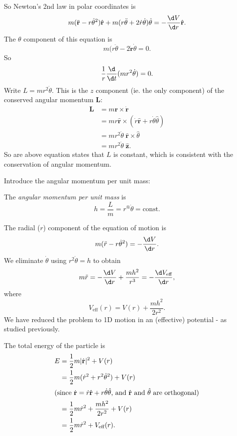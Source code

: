 \documentclass[a4paper]{article}
\begin{document}
So Newton's 2nd law in polar coordinates is
\[
  m(\ddot{\mathbf{r}} - r\hat{\theta}^2)\hat{\mathbf{r}} + m(r\ddot{\theta} + 2\dot{r}\dot{\theta})\hat{\theta} = -\frac{\d V}{\d r}\hat{\mathbf{r}}.
\]
The $\theta$ component of this equation is
\[
  m(r\ddot{\theta} - 2\dot{\mathbf{r}}\dot{\theta} = 0.
\]
So
\[
  \frac{1}{r}\frac{\d }{\d t}(mr^2 \dot{\theta}) = 0.
\]
Write $L = mr^2 \dot{\theta}$. This is the $z$ component (ie. the only component) of the conserved angular momentum $\mathbf{L}$:
\begin{align*}
  \mathbf{L} &= m\mathbf{r}\times \dot{\mathbf{r}}\\
  &= mr\hat{\mathbf{r}}\times (\dot{r}\hat{\mathbf{r}} + r\dot{\theta}\hat{\theta})\\
  &= mr^2 \dot{\theta}\; \hat{\mathbf{r}}\times \hat{\theta}\\
  &= mr^2 \dot{\theta}\; \hat{\mathbf{z}}.
\end{align*}
So are above equation states that $L$ is constant, which is consistent with the conservation of angular momentum.

Introduce the angular momentum per unit mass:
\begin{notation}
  The \emph{angular momentum per unit mass} is
  \[
    h = \frac{L}{m} = r^@\dot\theta = \text{const.}
  \]
\end{notation}
The radial ($r$) component of the equation of motion is
\[
  m(\ddot{r} - r\dot{\theta}^2) = -\frac{\d V}{\d r}.
\]
We eliminate $\dot{\theta}$ using $r^2\dot{\theta} = h$ to obtain
\[
  m\ddot{r} = -\frac{\d V}{\d r} + \frac{mh^2}{r^3} = -\frac{\d V_{\text{eff}}}{\d r},
\]
where 
\[
  V_{\text{eff}}(r) = V(r) + \frac{mh^2}{2r^2}.
\]
We have reduced the problem to 1D motion in an (effective) potential - as studied previously.

The total energy of the particle is
\begin{align*}
  E &= \frac{1}{2}m|\dot{\mathbf{r}}|^2 + V(r)\\
  &= \frac{1}{2}m(\dot{r}^2 + r^2\dot{\theta}^2) + V(r)\\
  \intertext{(since $\dot{\mathbf{r}} = \dot{r}\hat{\mathbf{r}} + r\dot{\theta}\hat{\theta}$, and $\hat{\mathbf{r}}$ and $\hat{\theta}$ are orthogonal)}
  &= \frac{1}{2}m\dot{r}^2 + \frac{mh^2}{2r^2} + V(r)\\
  &= \frac{1}{2}m\dot{r}^2 + V_{\text{eff}}(r).
\end{align*}
\end{document}
